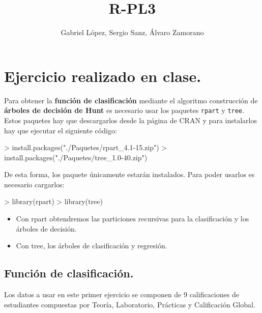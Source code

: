 \documentclass [a4paper] {article}
\title{R-PL3}
\author{Gabriel López, Sergio Sanz, Álvaro Zamorano}
\begin{document}


\maketitle

\graphicspath{ {./tmp/} }

\section{Ejercicio realizado en clase.}
Para obtener la \textbf{función de clasificación} mediante el algoritmo construcción
de \textbf{árboles de decisión de Hunt} es necesario usar los paquetes \texttt{rpart} y
\texttt{tree}. Estos paquetes hay que descargarlos desde la página de CRAN y para instalarlos
hay que ejecutar el siguiente código:

\begin{Schunk}
\begin{Sinput}
> install.packages("./Paquetes/rpart_4.1-15.zip")
> install.packages("./Paquetes/tree_1.0-40.zip")
\end{Sinput}
\end{Schunk}

\bigskip
De esta forma, los paquete únicamente estarán instalados. Para poder usarlos es necesario cargarlos:
\begin{Schunk}
\begin{Sinput}
> library(rpart)
> library(tree)
\end{Sinput}
\end{Schunk}

\begin{itemize}
\item Con rpart obtendremos las particiones recursivas para la clasificación y los árboles de decisión.
\item Con tree, los árboles de clasificación y regresión.
\end{itemize}


\subsection{Función de clasificación.}
Los datos a usar en este primer ejercicio se componen de 9 calificaciones de estudiantes compuestas por
Teoría, Laboratorio, Prácticas y Calificación Global.
\end{document}
